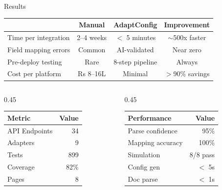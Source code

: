 \documentclass[aspectratio=169,11pt]{beamer}
\begin{document}
\begin{frame}{Results}
\begin{center}
{\small
\begin{tabular}{lccc}
\toprule
& \textbf{Manual} & \textbf{AdaptConfig} & \textbf{Improvement} \\
\midrule
Time per integration & 2--4 weeks & $<$ 5 minutes & \textcolor{ok}{$\sim$500x faster} \\
Field mapping errors & Common & AI-validated & \textcolor{ok}{Near zero} \\
Pre-deploy testing & Rare & 8-step pipeline & \textcolor{ok}{Always} \\
Cost per platform & Rs 8--16L & Minimal & \textcolor{ok}{$>$90\% savings} \\
\bottomrule
\end{tabular}
}
\end{center}

\vspace{0.5em}
\begin{columns}
\begin{column}{0.45\textwidth}
\centering
{\small
\begin{tabular}{lr}
\toprule
\textbf{Metric} & \textbf{Value} \\
\midrule
API Endpoints & 34 \\
Adapters & 9 \\
Tests & 899 \\
Coverage & 82\% \\
Pages & 8 \\
\bottomrule
\end{tabular}
}
\end{column}
\begin{column}{0.45\textwidth}
\centering
{\small
\begin{tabular}{lr}
\toprule
\textbf{Performance} & \textbf{Value} \\
\midrule
Parse confidence & 95\% \\
Mapping accuracy & 100\% \\
Simulation & 8/8 pass \\
Config gen & $<$ 5s \\
Doc parse & $<$ 1s \\
\bottomrule
\end{tabular}
}
\end{column}
\end{columns}
\end{frame}
\end{document}
